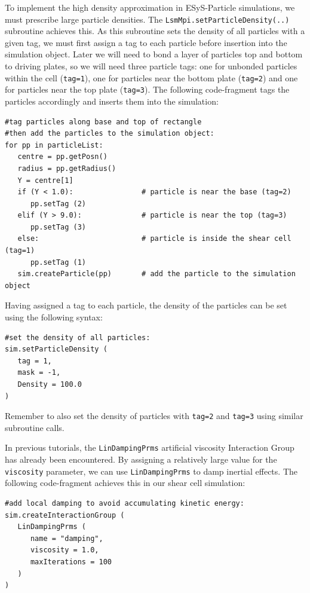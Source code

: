 To implement the high density approximation in ESyS-Particle simulations, we must prescribe large particle densities. The \texttt{LsmMpi.setParticleDensity(..)} subroutine achieves this. As this subroutine sets the density of all particles with a given tag, we must first assign a tag to each particle before insertion into the simulation object. Later we will need to bond a layer of particles top and bottom to driving plates, so we will need three particle tags: one for unbonded particles within the cell (\texttt{tag=1}), one for particles near the bottom plate (\texttt{tag=2}) and one for particles near the top plate (\texttt{tag=3}). The following code-fragment tags the particles accordingly and inserts them into the simulation:

\begin{verbatim}  
#tag particles along base and top of rectangle
#then add the particles to the simulation object:
for pp in particleList:
   centre = pp.getPosn()
   radius = pp.getRadius()
   Y = centre[1]
   if (Y < 1.0):                # particle is near the base (tag=2)
      pp.setTag (2)
   elif (Y > 9.0):              # particle is near the top (tag=3)
      pp.setTag (3)
   else:                        # particle is inside the shear cell (tag=1)
      pp.setTag (1)
   sim.createParticle(pp)       # add the particle to the simulation object
\end{verbatim}  

Having assigned a tag to each particle, the density of the particles can be set using the following syntax:

\begin{verbatim}
#set the density of all particles:
sim.setParticleDensity (
   tag = 1,
   mask = -1,
   Density = 100.0
)
\end{verbatim}

\noindent
Remember to also set the density of particles with \texttt{tag=2} and \texttt{tag=3} using similar subroutine calls.

In previous tutorials, the \texttt{LinDampingPrms} artificial viscosity Interaction Group has already been encountered. By assigning a relatively large value for the \texttt{viscosity} parameter, we can use \texttt{LinDampingPrms} to damp inertial effects. The following code-fragment achieves this in our shear cell simulation:

\begin{verbatim}
#add local damping to avoid accumulating kinetic energy:
sim.createInteractionGroup (
   LinDampingPrms (
      name = "damping",
      viscosity = 1.0,
      maxIterations = 100
   )
)
\end{verbatim}

